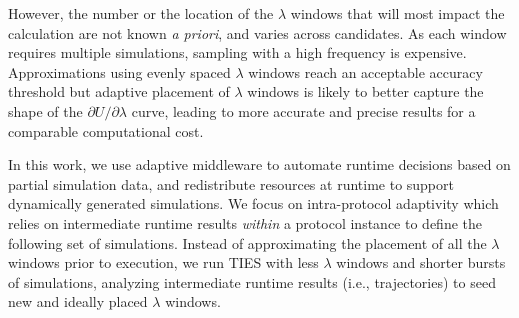 However, the number or the location of the $\lambda$ windows that will most
impact the calculation are not known \textit{a priori}, and varies across
candidates. As each window requires multiple simulations, sampling
with a high frequency is expensive. %
Approximations using evenly spaced $\lambda$ windows reach an acceptable
accuracy threshold but adaptive placement of $\lambda$ windows is likely to
better capture the shape of the $\partial U/\partial\lambda$ curve, leading
to more accurate and precise results for a comparable computational cost.

In this work, we use adaptive middleware to automate runtime decisions based
on partial simulation data, and redistribute resources at runtime
to support dynamically generated simulations. We focus on 
intra-protocol adaptivity which relies on
intermediate runtime results
\textit{within} a protocol instance to define the %
following set of %
simulations. %
Instead of approximating the placement of all the $\lambda$ windows prior to
execution, we run TIES with less $\lambda$ windows and shorter bursts of
simulations, analyzing intermediate runtime results (i.e., trajectories) to
seed new and ideally placed $\lambda$ windows.


  


